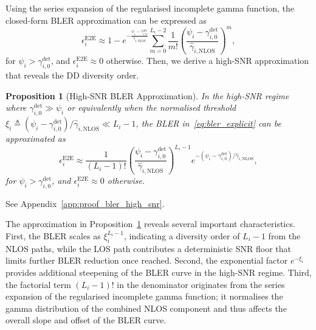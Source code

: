 \documentclass[journal]{IEEEtran}
\newtheorem{proposition}{Proposition}
\begin{document}
Using the series expansion of the regularised incomplete gamma function, the closed-form BLER approximation can be expressed as
\begin{equation}
\epsilon_i^{\mathrm{E2E}} \approx 1 - e^{-\frac{\psi_i - \gamma_{i,0}^{\mathrm{det}}}{\hat{\gamma}_{i,\mathrm{NLOS}}}} \sum_{m=0}^{L_i-2} \frac{1}{m!}\left(\frac{\psi_i - \gamma_{i,0}^{\mathrm{det}}}{\hat{\gamma}_{i,\mathrm{NLOS}}}\right)^m,
\label{eq:bler_explicit}
\end{equation}
for $\psi_i > \gamma_{i,0}^{\mathrm{det}}$, and $\epsilon_i^{\mathrm{E2E}} \approx 0$ otherwise. Then, we derive a high-SNR approximation that reveals the DD diversity order.
\begin{proposition}[High-SNR BLER Approximation]
\label{prop:bler_high_snr}
In the high-SNR regime where $\gamma_{i,0}^{\mathrm{det}} \gg \psi_i$ or equivalently when the normalised threshold $\xi_i \triangleq (\psi_i - \gamma_{i,0}^{\mathrm{det}})/\hat{\gamma}_{i,\mathrm{NLOS}} \ll L_i - 1$, the BLER in~\eqref{eq:bler_explicit} can be approximated as
\begin{equation}
\epsilon_i^{\mathrm{E2E}} \approx \frac{1}{(L_i-1)!} \left(\frac{\psi_i - \gamma_{i,0}^{\mathrm{det}}}{\hat{\gamma}_{i,\mathrm{NLOS}}}\right)^{L_i-1} e^{-(\psi_i - \gamma_{i,0}^{\mathrm{det}})/\hat{\gamma}_{i,\mathrm{NLOS}}},
\label{eq:bler_high_snr}
\end{equation}
for $\psi_i > \gamma_{i,0}^{\mathrm{det}}$, and $\epsilon_i^{\mathrm{E2E}} \approx 0$ otherwise.
\end{proposition}

\begin{IEEEproof}
See Appendix~\ref{app:proof_bler_high_snr}.
\end{IEEEproof}
The approximation in Proposition~\ref{prop:bler_high_snr} reveals several important characteristics. First, the BLER scales as $\xi_i^{L_i-1}$, indicating a diversity order of $L_i-1$ from the NLOS paths, while the LOS path contributes a deterministic SNR floor that limits further BLER reduction once reached. Second, the exponential factor $e^{-\xi_i}$ provides additional steepening of the BLER curve in the high-SNR regime. Third, the factorial term $(L_i-1)!$ in the denominator originates from the series expansion of the regularised incomplete gamma function; it normalises the gamma distribution of the combined NLOS component and thus affects the overall slope and offset of the BLER curve.
\end{document}

